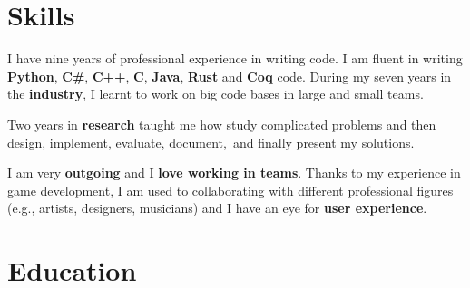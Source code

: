 \documentclass[letterpaper]{twentysecondcv} %
\begin{document}

\makeprofile %


\section{Skills}

I have nine years of professional experience in writing code. I am fluent in writing \textbf{Python}, \textbf{C\#}, \textbf{C++}, \textbf{C}, \textbf{Java}, \textbf{Rust} and \textbf{Coq} code. During my seven years in the \textbf{industry}, I learnt to work on big code bases in large and small teams.

Two years in \textbf{research} taught me how study complicated problems and then design, implement, evaluate, document, and finally present my solutions.

I am very \textbf{outgoing} and I \textbf{love working in teams}. Thanks to my experience in game development, I am used to collaborating with different professional figures (e.g., artists, designers, musicians) and I have an eye for \textbf{user experience}.\\

\section{Education}

\begin{twenty} %
\end{twenty}
\end{document}
